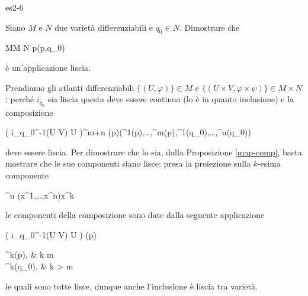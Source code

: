 {es2-6}
{
Siano $ M $ e $ N $ due varietà differenziabili e $ q_{0} \in N $. Dimostrare che

	{M}{M \times N}
	{p}{(p,q_{0})}

è un'applicazione liscia.
}
{
Prendiamo gli atlanti differenziabili $ \{(U,\varphi)\} \in M $ e $ \{(U \times V,\varphi \times \psi)\} \in M \times N $: perché $ i_{q_{0}} $ sia liscia questa deve essere continua (lo è in quanto inclusione) e la composizione

	{\varphi( i_{q_{0}}^{-1}(U \times V) \cap U )}{\R^{m+n}}
	{\varphi(p)}{(\varphi^{1}(p),\dots,\varphi^{m}(p),\psi^{1}(q_{0}),\dots,\psi^{n}(q_{0}))}

deve essere liscia. Per dimostrare che lo sia, dalla Proposizione \ref{map-comp}, basta mostrare che le sue componenti siano lisce: presa la proiezione sulla $ k $-esima componente

	{\R^{n}}{\R}
	{(x^{1},\dots,x^{n})}{x^{k}}

le componenti della composizione sono date dalla seguente applicazione

	{\varphi( i_{q_{0}}^{-1}(U \times V) \cap U )}{\R}
	{\varphi(p)}{%
					\begin{cases}
						\varphi^{k}(p), & k \leqslant m \\
						\psi^{k}(q_{0}), & k > m
					\end{cases}%
					}

le quali sono tutte lisce, dunque anche l'inclusione è liscia tra varietà.
}


